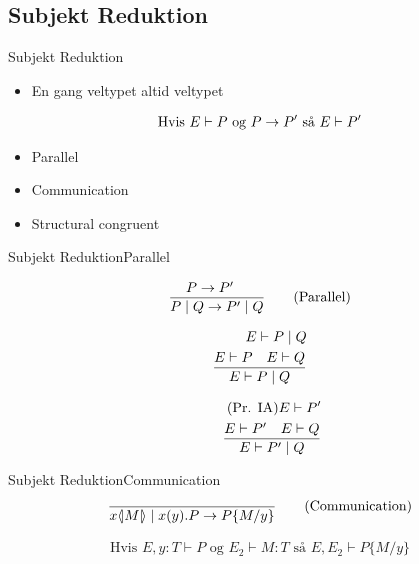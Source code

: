 \subsection{Subjekt Reduktion}
\begin{frame}{Subjekt Reduktion}

\begin{itemize}
\item En gang veltypet altid veltypet
\end{itemize}
\begin{align*}
\text{Hvis } E \vdash P \text{ og } P \rightarrow P' \text{ så } E \vdash P'
\end{align*}



\begin{itemize}
\item Parallel
\item Communication
\item Structural congruent
\end{itemize}
\end{frame}

\begin{frame}{Subjekt Reduktion}{Parallel}

\begin{align*}
\frac{P \rightarrow P' \quad}{P \mid Q \rightarrow P' \mid Q} \tag{Parallel}\\
\end{align*}

\begin{align*}
E \vdash P \mid Q\\
\frac{E \vdash P \quad E \vdash Q}{E \vdash P \mid Q}\\
\end{align*}

\begin{align*}
\tag{Pr. IA} E \vdash P'\\
\frac{E \vdash P' \quad E \vdash Q}{E \vdash P' \mid Q}
\end{align*}

\end{frame}

\begin{frame}{Subjekt Reduktion}{Communication}
\begin{align*}
\frac{}{x \langle \! | M | \! \rangle \mid x(y).P \rightarrow P\{M/y\}} \tag{Communication}
\end{align*}

\begin{align*}
\tag{Lemma substitution} \text{Hvis } E,y:T \vdash P \text{ og } E_2 \vdash M:T \text{ så } E,E_2\vdash P\{M/y\}
\end{align*}

\end{frame}

